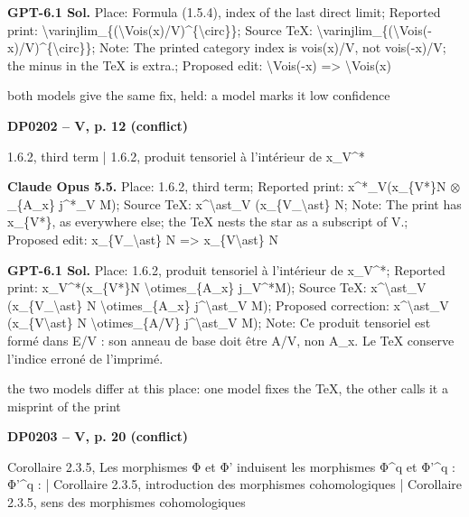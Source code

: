 \textbf{GPT-6.1 Sol.} Place: Formula (1.5.4), index of the last direct limit; Reported print: \textbackslash{}varinjlim\_\{(\textbackslash{}Vois(x)/V)\textasciicircum{}\{\textbackslash{}circ\}\}; Source TeX: \textbackslash{}varinjlim\_\{(\textbackslash{}Vois(-x)/V)\textasciicircum{}\{\textbackslash{}circ\}\}; Note: The printed category index is vois(x)/V, not vois(-x)/V; the minus in the TeX is extra.; Proposed edit: \textbackslash{}Vois(-x) =\allowbreak > \textbackslash{}Vois(x)\par
both models give the same fix, held: a model marks it low confidence\par
\par\noindent\hypertarget{DP0202}{}\textbf{DP0202 -- V, p. 12 (conflict)}\par
1.6.2, third term | 1.6.2, produit tensoriel à l'intérieur de x\_V\textasciicircum{}*\par
\textbf{Claude Opus 5.5.} Place: 1.6.2, third term; Reported print: x\textasciicircum{}*\_V(x\_\{V*\}N \ensuremath{\otimes}\_\{A\_x\} j\textasciicircum{}*\_V M); Source TeX: x\textasciicircum{}\textbackslash{}ast\_V (x\_\{V\_\textbackslash{}ast\} N; Note: The print has x\_\{V*\}, as everywhere else; the TeX nests the star as a subscript of V.; Proposed edit: x\_\{V\_\textbackslash{}ast\} N =\allowbreak > x\_\{V\textbackslash{}ast\} N\par
\textbf{GPT-6.1 Sol.} Place: 1.6.2, produit tensoriel à l'intérieur de x\_V\textasciicircum{}*; Reported print: x\_V\textasciicircum{}*(x\_\{V*\}N \textbackslash{}otimes\_\{A\_x\} j\_V\textasciicircum{}*M); Source TeX: x\textasciicircum{}\textbackslash{}ast\_V (x\_\{V\_\textbackslash{}ast\} N \textbackslash{}otimes\_\{A\_x\}   j\textasciicircum{}\textbackslash{}ast\_V M); Proposed correction: x\textasciicircum{}\textbackslash{}ast\_V (x\_\{V\textbackslash{}ast\} N \textbackslash{}otimes\_\{A/V\} j\textasciicircum{}\textbackslash{}ast\_V M); Note: Ce produit tensoriel est formé dans E/V : son anneau de base doit être A/V, non A\_x. Le TeX conserve l'indice erroné de l'imprimé.\par
the two models differ at this place: one model fixes the TeX, the other calls it a misprint of the print\par
\par\noindent\hypertarget{DP0203}{}\textbf{DP0203 -- V, p. 20 (conflict)}\par
Corollaire 2.3.5, Les morphismes Φ et Φ' induisent les morphismes Φ\textasciicircum{}q et Φ'\textasciicircum{}q : Φ'\textasciicircum{}q : | Corollaire 2.3.5, introduction des morphismes cohomologiques | Corollaire 2.3.5, sens des morphismes cohomologiques\par
